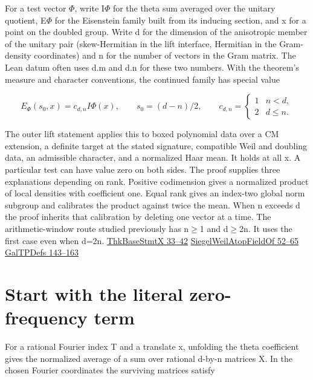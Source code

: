 \documentclass[11pt,letterpaper]{article}
\begin{document}
For a test vector \ensuremath{\Phi}, write I\ensuremath{\Phi} for the theta sum averaged over the unitary quotient, E\ensuremath{\Phi} for the Eisenstein family built from its inducing section, and x for a point on the doubled group. Write d for the dimension of the anisotropic member of the unitary pair (skew-Hermitian in the lift interface, Hermitian in the Gram-density coordinates) and n for the number of vectors in the Gram matrix. The Lean datum often uses {\ttfamily\small d.\allowbreak{}m} and {\ttfamily\small d.\allowbreak{}n} for these two numbers. With the theorem’s measure and character conventions, the continued family has special value

\[E_\Phi{}(s_0,x)=c_{d,n}I\Phi{}(x),\qquad s_0=(d-n)/2,\qquad
 c_{d,n}=\begin{cases}1&n<d,\\2&d\le n.\end{cases}\]

The outer lift statement applies this to boxed polynomial data over a CM extension, a definite target at the stated signature, compatible Weil and doubling data, an admissible character, and a normalized Haar mean. It holds at all x. A particular test can have value zero on both sides. The proof supplies three explanations depending on rank. Positive codimension gives a normalized product of local densities with coefficient one. Equal rank gives an index-two global norm subgroup and calibrates the product against twice the mean. When n exceeds d the proof inherits that calibration by deleting one vector at a time. The arithmetic-window route studied previously has n\ensuremath{\ge}1 and d\ensuremath{\ge}2n. It uses the first case even when d=2n. \href{https://github.com/nousentllc/riemann-hypothesis/blob/40e56bab026552e089d7afcfeff08d2defb9c005/src/Development/AutomorphicArithmetic/Foundations/GaloisRepresentations/ThetaParseval/ThetaKernels/ThkBaseStmtX.lean\#L33-L42}{ThkBaseStmtX 33–42} \href{https://github.com/nousentllc/riemann-hypothesis/blob/40e56bab026552e089d7afcfeff08d2defb9c005/src/Development/AutomorphicArithmetic/Foundations/GaloisRepresentations/ThetaParseval/ThetaKernels/SiegelWeilAtopFieldOf.lean\#L52-L65}{SiegelWeilAtopFieldOf 52–65} \href{https://github.com/nousentllc/riemann-hypothesis/blob/40e56bab026552e089d7afcfeff08d2defb9c005/src/Development/AutomorphicArithmetic/Foundations/GaloisRepresentations/ThetaParseval/ThetaKernels/GalTPDefs.lean\#L143-L163}{GalTPDefs 143–163}

\section{Start with the literal zero-frequency term}
For a rational Fourier index T and a translate x, unfolding the theta coefficient gives the normalized average of a sum over rational d-by-n matrices X. In the chosen Fourier coordinates the surviving matrices satisfy
\end{document}

